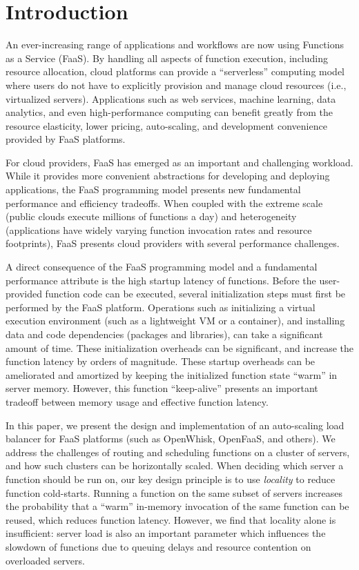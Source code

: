 \section{Introduction}
An ever-increasing range of applications and workflows are now using  Functions as a Service (FaaS).
By handling all aspects of function execution, including resource allocation, cloud platforms can provide a ``serverless'' computing model where users do not have to explicitly provision and manage cloud resources (i.e., virtualized servers). 
Applications such as web services, machine learning, data analytics, and even high-performance computing can benefit greatly from the resource elasticity, lower pricing, auto-scaling, and development convenience provided by FaaS platforms. 

For cloud providers, FaaS has emerged as an important and challenging workload. 
While it provides more convenient abstractions for developing and deploying applications, the FaaS programming model presents new fundamental performance and efficiency tradeoffs.
When coupled with the extreme scale (public clouds execute millions of functions a day) and heterogeneity (applications have widely varying function invocation rates and resource footprints), FaaS presents cloud providers with several performance challenges. 

A direct consequence of the FaaS programming model and a fundamental performance attribute is the high startup latency of functions. 
Before the user-provided function code can be executed, several initialization steps must first be performed by the FaaS platform. 
Operations such as initializing a virtual execution environment (such as a lightweight VM or a container), and installing data and code dependencies (packages and libraries), can take a significant amount of time. %
These initialization overheads can be significant, and increase the function latency by orders of magnitude. 
These startup overheads can be ameliorated and amortized by keeping the initialized function state ``warm'' in server memory.
However, this function ``keep-alive'' presents an important tradeoff between memory usage and effective function latency. 


In this paper, we present the design and implementation of an auto-scaling load balancer for FaaS platforms (such as OpenWhisk, OpenFaaS, and others).
We address the challenges of routing and scheduling functions on a cluster of servers, and how such clusters can be horizontally scaled. 
When deciding which server a function should be run on, our key design principle is to use \emph{locality} to reduce function cold-starts.
Running a function on the same subset of servers increases the probability that a ``warm'' in-memory invocation of the same function can be reused, which reduces function latency. 
However, we find that locality alone is insufficient: server load is also an important parameter which influences the slowdown of functions due to queuing delays and resource contention on overloaded servers. 

